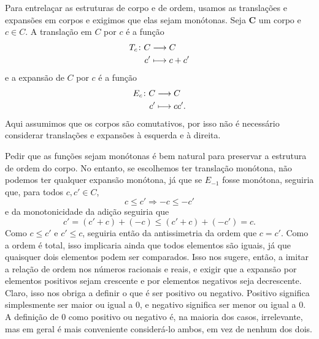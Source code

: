 Para entrelaçar as estruturas de corpo e de ordem, usamos as translações e expansões em corpos e exigimos que elas sejam monótonas. Seja $\bm C$ um corpo e $c \in C$. A translação em $C$ por $c$ é a função
	\begin{align*}
	{T_c}\colon {C} &\longrightarrow {C} \\{c'} &\longmapsto c+c'
	\end{align*}
e a expansão de $C$ por $c$ é a função
	\begin{align*}
	{E_c}\colon {C} &\longrightarrow {C} \\{c'} &\longmapsto cc'.
	\end{align*}
Aqui assumimos que os corpos são comutativos, por isso não é necessário considerar translações e expansões à esquerda e à direita.

Pedir que as funções sejam monótonas é bem natural para preservar a estrutura de ordem do corpo. No entanto, se escolhemos ter translação monótona, não podemos ter qualquer expansão monótona, já que se $E_{-1}$ fosse monótona, seguiria que, para todos $c,c' \in C$,
	\begin{equation*}
	c \leq c' \Rightarrow -c \leq -c'
	\end{equation*}
e da monotonicidade da adição seguiria que
	\begin{equation*}
	c' = (c'+c) + (-c) \leq (c'+c) + (-c') = c.
	\end{equation*}
Como $c \leq c'$ e $c' \leq c$, seguiria então da antissimetria da ordem que $c=c'$. Como a ordem é total, isso implicaria ainda que todos elementos são iguais, já que quaisquer dois elementos podem ser comparados. Isso nos sugere, então, a imitar a relação de ordem nos números racionais e reais, e exigir que a expansão por elementos positivos sejam crescente e por elementos negativos seja decrescente. Claro, isso nos obriga a definir o que é ser positivo ou negativo. Positivo significa simplesmente ser maior ou igual a $0$, e negativo significa ser menor ou igual a $0$. A definição de $0$ como positivo ou negativo é, na maioria dos casos, irrelevante, mas em geral é mais conveniente considerá-lo ambos, em vez de nenhum dos dois.

